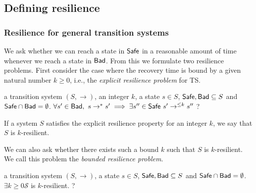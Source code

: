 
\iffalse
\subsection{Defining resilience}


\subsubsection{Resilience for general transition systems}


We ask whether we can reach a state 
in 
%
$\textsf{Safe}$  in a reasonable amount of time whenever we reach a state 
in
%
$\textsf{Bad}$. 
From this we formulate two resilience problems. First consider the case where the recovery time
is bound by a given natural number $k \geq 0$, i.e., the \emph{explicit resilience problem} for TS.

{a transition system $(S,\rightarrow)$, an integer $k$, a state $s \in S$, $\textsf{Safe}, \textsf{Bad} \subseteq S$ and $\textsf{Safe} \cap \textsf{Bad} = \emptyset$.}
{$\forall s' \in \textsf{Bad}, ~ s \rightarrow^* s' \implies \exists s'' \in \textsf{Safe} ~ s' \rightarrow^{\leq k} s''$ ?\newline}

If a system $S$ satisfies the explicit resilience property for an integer $k$, we say that $S$ is $k$-resilient.


We can also ask whether there exists such a bound $k$ such that $S$ is $k$-resilient. We call this problem the \emph{bounded resilience problem}.

%
%


{a transition system $(S,\rightarrow)$, a state $s \in S$, $\textsf{Safe}, \textsf{Bad} \subseteq S$ and $\textsf{Safe} \cap \textsf{Bad} = \emptyset$.}
{$\exists k \geq 0  \mathscr{S}$ is $k$-resilient. ?\newline}

